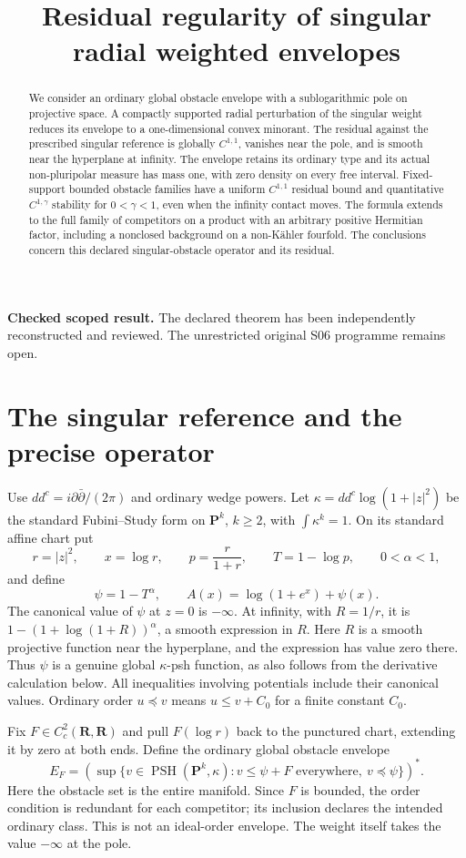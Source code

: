 \documentclass[11pt]{article}
\title{Residual regularity of singular radial weighted envelopes}
\author{}\date{}
\newcommand{\D}{dd^c}
\newcommand{\PSH}{\operatorname{PSH}}
\theoremstyle{remark}\newtheorem{remark}[theorem]{Remark}
\begin{document}
\maketitle
\begin{abstract}
We consider an ordinary global obstacle envelope with a sublogarithmic
pole on projective space. A compactly supported radial perturbation of
the singular weight reduces its envelope to a one-dimensional convex
minorant. The residual against the prescribed singular reference is
globally $C^{1,1}$, vanishes near the pole, and is smooth near the
hyperplane at infinity. The envelope retains its ordinary type and its
actual non-pluripolar measure has mass one, with zero density on every
free interval. Fixed-support bounded obstacle families have a uniform
$C^{1,1}$ residual bound and quantitative $C^{1,\gamma}$ stability for
$0<\gamma<1$, even when the infinity contact moves. The formula extends to the full family of competitors on
a product with an arbitrary positive Hermitian factor, including a
nonclosed background on a non-K\"ahler fourfold. The conclusions concern
this declared singular-obstacle operator and its residual.
\end{abstract}
\noindent\textbf{Checked scoped result.} The declared theorem has been
independently reconstructed and reviewed. The unrestricted original
S06 programme remains open.

\section{The singular reference and the precise operator}
Use $\D=i\partial\bar\partial/(2\pi)$ and ordinary wedge powers.
Let $\kappa=\D\log(1+|z|^2)$ be the standard Fubini--Study form on
$\mathbf P^k$, $k\geq2$, with $\int\kappa^k=1$. On its standard affine
chart put
\[
 r=|z|^2,\qquad x=\log r,\qquad p=\frac r{1+r},\qquad
 T=1-\log p,\qquad 0<\alpha<1,
\]
and define
\[
 \psi=1-T^\alpha,\qquad
 A(x)=\log(1+e^x)+\psi(x).
\]
The canonical value of $\psi$ at $z=0$ is $-\infty$.
At infinity, with $R=1/r$, it is
$1-(1+\log(1+R))^\alpha$, a smooth expression in $R$.
Here $R$ is a smooth projective function near the hyperplane, and the
expression has value zero there. Thus $\psi$ is a genuine global
$\kappa$-psh function, as also follows from the derivative
calculation below. All inequalities involving potentials include their
canonical values. Ordinary order $u\preceq v$ means $u\leq v+C_0$
for a finite constant $C_0$.

Fix $F\in C_c^2(\mathbf R,\mathbf R)$ and pull $F(\log r)$ back to
the punctured chart, extending it by zero at both ends. Define the
ordinary global obstacle envelope
\begin{equation}\label{eq:envelope}
 E_F=\left(\sup\{v\in\PSH(\mathbf P^k,\kappa):
       v\leq\psi+F\text{ everywhere},\ v\preceq\psi\}\right)^*.
\end{equation}
Here the obstacle set is the entire manifold. Since $F$ is bounded,
the order condition is redundant for each competitor; its inclusion
declares the intended ordinary class. This is not an ideal-order
envelope. The weight itself takes the value $-\infty$ at the pole.
\end{document}
